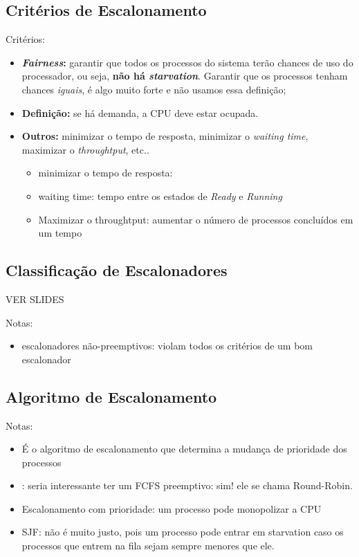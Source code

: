 \subsection{Critérios de Escalonamento}
Critérios:
\begin{itemize}
  \item \textbf{\textit{Fairness}:} garantir que todos os processos do sistema terão chances de uso do processador, ou seja, \textbf{não há \textit{starvation}}. Garantir que os processos tenham chances \textit{iguais}, é algo muito forte e não usamos essa definição;

  \item \textbf{Definição:} se há demanda, a CPU deve estar ocupada.

  \item \textbf{Outros:} minimizar o tempo de resposta, minimizar o \textit{waiting time}, maximizar o \textit{throughtput}, etc..
  \begin{itemize}
    \item minimizar o tempo de resposta: %
    \item waiting time: tempo entre os estados de \textit{Ready} e \textit{Running}
    \item Maximizar o throughtput: aumentar o número de processos concluídos em um tempo
  \end{itemize}
\end{itemize}


\subsection{Classificação de Escalonadores}
VER SLIDES

Notas:
\begin{itemize}
  \item escalonadores não-preemptivos: violam todos os critérios de um bom escalonador
\end{itemize}


\subsection{Algoritmo de Escalonamento}

Notas:
\begin{itemize}
  \item É o algoritmo de escalonamento que determina a mudança de prioridade dos processos

  \item: seria interessante ter um FCFS preemptivo: sim! ele se chama Round-Robin.

  \item Escalonamento com prioridade: um processo pode monopolizar a CPU %

  \item SJF: não é muito justo, pois um processo pode entrar em starvation caso os processos que entrem na fila sejam sempre menores que ele.
\end{itemize}



